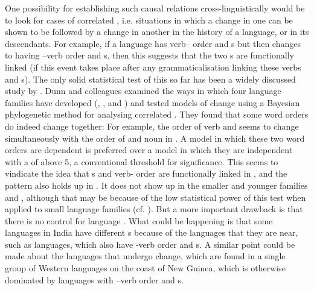 \documentclass[output=paper]{langsci/langscibook}
\begin{document}
One possibility for establishing such causal relations cross-linguistically would be to look for cases of correlated , i.e. situations in which a change in one  can be shown to be followed by a change in another  in the history of a language, or in its descendants. For example, if a language has verb– order and s but then changes to having –verb order and s, then this suggests that the two s are functionally linked (if this event takes place after any grammaticalisation linking these verbs and s). The only solid statistical test of this so far has been a widely discussed study by \citet{DunnEtAl2011}. Dunn and colleagues examined the ways in which four language families have developed (, ,  and ) and tested models of  change using a Bayesian phylogenetic method for analysing correlated . They found that some word orders do indeed change together: For example, the order of verb and  seems to change simultaneously with the order of  and noun in . A model in which these two word orders are dependent is preferred over a model in which they are independent with a  of above 5, a conventional threshold for significance. This seems to vindicate the idea that s and verb- order are functionally linked in , and the pattern also holds up in . It does not show up in the smaller and younger families  and , although that may be because of the low statistical power of this test when applied to small language families (cf. \citealt{CroftEtAl2011}). But a more important drawback is that there is no control for language . What could be happening is that some  languages in India have different s because of the languages that they are near, such as  languages, which also have -verb order and s.  A similar point could be made about the  languages that undergo  change, which are found in a single group of Western  languages on the coast of New Guinea, which is otherwise dominated by languages with –verb order and s.
\end{document}
